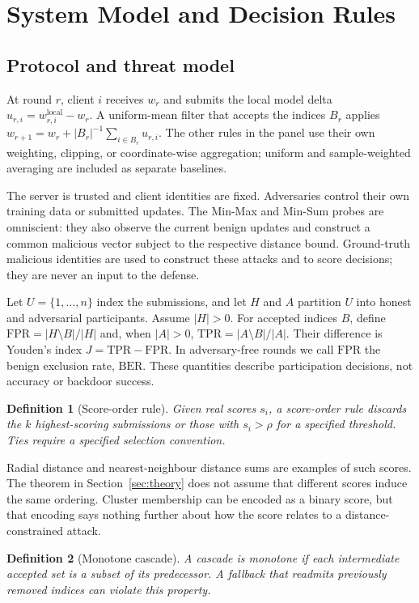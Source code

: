\documentclass[journal]{IEEEtran}
\newtheorem{definition}{Definition}
\newcommand{\BER}{\mathrm{BER}}
\begin{document}
\section{System Model and Decision Rules}\label{sec:model}
\subsection{Protocol and threat model}
At round $r$, client $i$ receives $w_r$ and submits the local model delta $u_{r,i}=w^{\mathrm{local}}_{r,i}-w_r$. A uniform-mean filter that accepts the indices $B_r$ applies $w_{r+1}=w_r+|B_r|^{-1}\sum_{i\in B_r}u_{r,i}$. The other rules in the panel use their own weighting, clipping, or coordinate-wise aggregation; uniform and sample-weighted averaging are included as separate baselines.

The server is trusted and client identities are fixed. Adversaries control their own training data or submitted updates. The Min-Max and Min-Sum probes are omniscient: they also observe the current benign updates and construct a common malicious vector subject to the respective distance bound. Ground-truth malicious identities are used to construct these attacks and to score decisions; they are never an input to the defense.

Let $U=\{1,\ldots,n\}$ index the submissions, and let $H$ and $A$ partition $U$ into honest and adversarial participants. Assume $|H|>0$. For accepted indices $B$, define $\mathrm{FPR}=|H\setminus B|/|H|$ and, when $|A|>0$, $\mathrm{TPR}=|A\setminus B|/|A|$. Their difference is Youden's index $J=\mathrm{TPR}-\mathrm{FPR}$. In adversary-free rounds we call $\mathrm{FPR}$ the benign exclusion rate, $\BER$. These quantities describe participation decisions, not accuracy or backdoor success.

\begin{definition}[Score-order rule]\label{def:dispersion}
Given real scores $s_i$, a score-order rule discards the $k$ highest-scoring submissions or those with $s_i>\rho$ for a specified threshold. Ties require a specified selection convention.
\end{definition}
Radial distance and nearest-neighbour distance sums are examples of such scores. The theorem in Section~\ref{sec:theory} does not assume that different scores induce the same ordering. Cluster membership can be encoded as a binary score, but that encoding says nothing further about how the score relates to a distance-constrained attack.

\begin{definition}[Monotone cascade]\label{def:cascade}
A cascade is monotone if each intermediate accepted set is a subset of its predecessor. A fallback that readmits previously removed indices can violate this property.
\end{definition}
\end{document}

